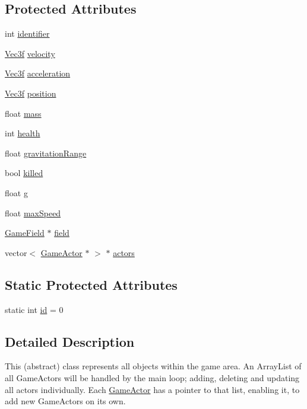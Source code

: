 \subsection*{Protected Attributes}
\begin{DoxyCompactItemize}
\item 
int \hyperlink{class_game_actor_af0f1723601974c63c9df8a60a6ce7da7}{identifier}
\item 
\hyperlink{class_vec3f}{Vec3f} \hyperlink{class_game_actor_a95518bf01411eafe983df8815e8682d1}{velocity}
\item 
\hyperlink{class_vec3f}{Vec3f} \hyperlink{class_game_actor_aa62fdbdad09045bcd6f3a150c3a0038b}{acceleration}
\item 
\hyperlink{class_vec3f}{Vec3f} \hyperlink{class_game_actor_aefed3c91bf32ad388d86657b3bb9ddfa}{position}
\item 
float \hyperlink{class_game_actor_a2111233f4f0216db4d172d5088ebeed4}{mass}
\item 
int \hyperlink{class_game_actor_a5d402a953140585fb7cc3f8a3a24a2a4}{health}
\item 
float \hyperlink{class_game_actor_a9c0ba51b08a3e617d9629c0ee8d309f2}{gravitation\+Range}
\item 
bool \hyperlink{class_game_actor_a7f8bd5ef8278fda5db77a372d8bb6bb9}{killed}
\item 
float \hyperlink{class_game_actor_a42ed4bef0d99cf053ff9a025c86d34d3}{g}
\item 
float \hyperlink{class_game_actor_a15b6abd006c52b21c569932f8b484eb0}{max\+Speed}
\item 
\hyperlink{class_game_field}{Game\+Field} $\ast$ \hyperlink{class_game_actor_a0224fbc502abd6b7579787aa234332d5}{field}
\item 
vector$<$ \hyperlink{class_game_actor}{Game\+Actor} $\ast$ $>$ $\ast$ \hyperlink{class_game_actor_a2405618d895f5143b42ae9e94d20e693}{actors}
\end{DoxyCompactItemize}
\subsection*{Static Protected Attributes}
\begin{DoxyCompactItemize}
\item 
static int \hyperlink{class_game_actor_a07be525e1e463a4f437dba30f0173b6c}{id} = 0
\end{DoxyCompactItemize}


\subsection{Detailed Description}
This (abstract) class represents all objects within the game area. An Array\+List of all Game\+Actors will be handled by the main loop; adding, deleting and updating all actors individually. Each \hyperlink{class_game_actor}{Game\+Actor} has a pointer to that list, enabling it, to add new Game\+Actors on its own. 

